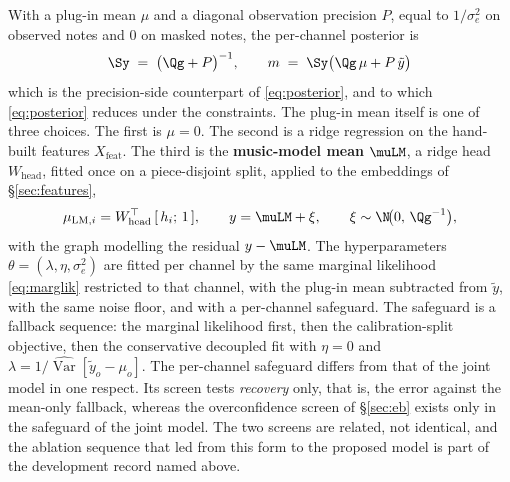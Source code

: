 With a plug-in mean $\mu$ and a diagonal observation precision $P$, equal to
$1/\sigma_e^2$ on observed notes and $0$ on masked notes, the per-channel
posterior is
\begin{equation}
  \Sy \;=\; \bigl(\Qg + P\bigr)^{-1}, \qquad
  m \;=\; \Sy \bigl(\Qg\, \mu + P\, \tilde y\bigr)
  \label{eq:posterior-chan}
\end{equation}
which is the precision-side counterpart of \eqref{eq:posterior}, and to
which \eqref{eq:posterior} reduces under the constraints. The plug-in mean
itself is one of three choices. The first is $\mu = 0$. The second is a
ridge regression on the hand-built features $X_{\mathrm{feat}}$. The third
is the \textbf{music-model mean} $\muLM$, a ridge head $W_{\mathrm{head}}$,
fitted once on a piece-disjoint split, applied to the embeddings of
\S\ref{sec:features},
\begin{equation}
  \mu_{\mathrm{LM},i} = W_{\mathrm{head}}^{\top}\,[\, h_i;\, 1\,],
  \qquad
  y = \muLM + \xi, \qquad \xi \sim \N\!\bigl(0,\, \Qg^{-1}\bigr),
  \label{eq:lm-mean}
\end{equation}
with the graph modelling the residual $y - \muLM$. The hyperparameters
$\theta = (\lambda, \eta, \sigma_e^2)$ are fitted per channel by the same
marginal likelihood \eqref{eq:marglik} restricted to that channel, with the
plug-in mean subtracted from $\tilde y$, with the same noise floor, and with
a per-channel safeguard. The safeguard is a fallback sequence: the marginal
likelihood first, then the calibration-split objective, then the
conservative decoupled fit with $\eta = 0$ and
$\lambda = 1/\widehat{\operatorname{Var}}[\tilde y_o - \mu_o]$. The
per-channel safeguard differs from that of the joint model in one respect.
Its screen tests \emph{recovery} only, that is, the error against the
mean-only fallback, whereas the overconfidence screen of \S\ref{sec:eb}
exists only in the safeguard of the joint model. The two screens are
related, not identical, and the ablation sequence that led from this form to
the proposed model is part of the development record named above.

